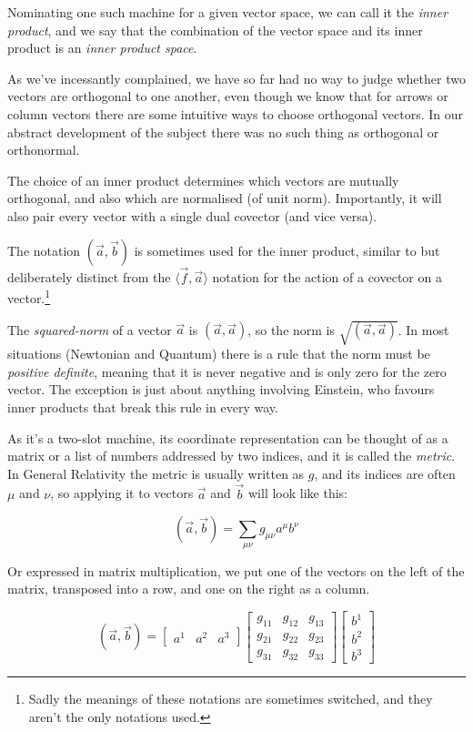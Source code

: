Nominating one such machine for a given vector space, we can call it the \textit{inner product}, and we say that the combination of the vector space and its inner product is an \textit{inner product space}.

As we've incessantly complained, we have so far had no way to judge whether two vectors are orthogonal to one another, even though we know that for arrows or column vectors there are some intuitive ways to choose orthogonal vectors. In our abstract development of the subject there was no such thing as orthogonal or orthonormal.

The choice of an inner product determines which vectors are mutually orthogonal, and also which are normalised (of unit norm). Importantly, it will also pair every vector with a single dual covector (and vice versa).

The notation $(\vec{a},\vec{b})$ is sometimes used for the inner product, similar to but deliberately distinct from the $\langle \vec{f},\vec{a}\rangle$ notation for the action of a covector on a vector.\footnote{Sadly the meanings of these notations are sometimes switched, and they aren't the only notations used.}

The \textit{squared-norm} of a vector $\vec{a}$ is $(\vec{a},\vec{a})$, so the norm is $\sqrt{(\vec{a},\vec{a})}$. In most situations (Newtonian and Quantum) there is a rule that the norm must be \textit{positive definite}, meaning that it is never negative and is only zero for the zero vector. The exception is just about anything involving Einstein, who favours inner products that break this rule in every way.

As it's a two-slot machine, its coordinate representation can be thought of as a matrix or a list of numbers addressed by two indices, and it is called the \textit{metric}. In General Relativity the metric is usually written as $g$, and its indices are often $\mu$ and $\nu$, so applying it to vectors $\vec{a}$ and $\vec{b}$ will look like this:

$$
(\vec{a},\vec{b}) = \sum_{\mu\nu} g_{\mu\nu} a^\mu b^\nu
$$

Or expressed in matrix multiplication, we put one of the vectors on the left of the matrix, transposed into a row, and one on the right as a column.

$$
(\vec{a}, \vec{b}) =
\begin{bmatrix}
a^1 & a^2 & a^3
\end{bmatrix}
\begin{bmatrix}
g_{11} & g_{12} & g_{13} \\
g_{21} & g_{22} & g_{23} \\
g_{31} & g_{32} & g_{33}
\end{bmatrix}
\begin{bmatrix}
b^1 \\ b^2 \\ b^3
\end{bmatrix}
$$

